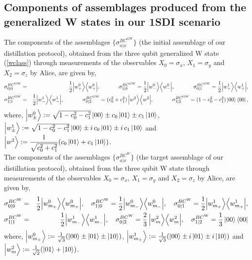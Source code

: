 \documentclass[reprint,superscriptaddress,nofootinbib,amsmath,amssymb,aps,pra,longbibliography]{revtex4-1}
\begin{document}
\begin{widetext}
\section{Components of assemblages produced from the generalized W states in our 1SDI scenario}\label{W_assemb_1SDI}
The components of the assemblages $\{\sigma_{a|x}^{BC^{GW}}\}$ (the initial assemblage of our distillation protocol), obtained from the three qubit generalized W state (\ref{wclass}) through measurements of the observables $X_0= \sigma_x$, $X_1=\sigma_y$ and $X_2=\sigma_z$ by Alice, are given by,  
\begin{eqnarray}
	\sigma_{0|0}^{BC^{\text{GW}}} &=& \frac{1}{2} \Big|w_+^0 \Big\rangle \Big\langle w_+^0 \Big|, \quad  \hspace{0.87cm}		
	\sigma_{1|0}^{BC^{\text{GW}}} = \frac{1}{2} \Big|w_-^0 \Big\rangle \Big\langle w_-^0 \Big|, \quad 	\hspace{0.87cm}
	\sigma_{0|1}^{BC^{\text{GW}}} = \frac{1}{2} \Big|w_+^1 \Big\rangle \Big\langle w_+^1 \Big|, 	 \nonumber \\
	\sigma_{1|1}^{BC^{\text{GW}}} &=& \frac{1}{2} \Big|w_-^1 \Big\rangle \Big\langle w_-^1 \Big|, \quad 	\hspace{0.87cm}
	\sigma_{0|2}^{BC^{\text{GW}}} =   (c_0^2+c_1^2) \, \Big|w^2 \Big\rangle \Big\langle w^2 \Big|,\quad 	\hspace{0.87cm}
	\sigma_{1|2}^{BC^{\text{GW}}} =  (1-c_0^2-c_1^2) \ket{00}\bra{00},
	\label{wassemblage}
\end{eqnarray}
where, $\Big|w_{\pm}^0\Big\rangle := \sqrt{1-c_0^2-c_1^2} \ket{00} \pm c_0 \ket{01} \pm c_1 \ket{10}$, $\Big|w_{\pm}^1\Big\rangle := \sqrt{1-c_0^2-c_1^2} \ket{00} \pm i \, c_0 \ket{01} \pm i \, c_1 \ket{10}$ and $\Big|w^2\Big\rangle :=  \dfrac{1}{\sqrt{c_0^2 + c_1^2}}(c_0 \ket{01} + c_1 \ket{10})$.\\

The components of the assemblages $\{\sigma_{a|x}^{BC^{W}}\}$ (the target assemblage of our distillation protocol), obtained from the three qubit W state through measurements of the observables $X_0= \sigma_x$, $X_1=\sigma_y$ and $X_2=\sigma_z$ by Alice, are given by,  
\begin{eqnarray}
	\sigma_{0|0}^{BC^{\text{W}}} &=& \frac{1}{2} \Big|w_{m_+}^0 \Big\rangle \Big\langle w_{m_+}^0 \Big|, \quad  		
	\sigma_{1|0}^{BC^{\text{W}}} = \frac{1}{2} \Big|w_{m_-}^0 \Big\rangle \Big\langle w_{m_-}^0 \Big|, \quad 
	\sigma_{0|1}^{BC^{\text{W}}} = \frac{1}{2} \Big|w_{m_+}^1 \Big\rangle \Big\langle w_{m_+}^1 \Big|,  \nonumber \\ 		
	\sigma_{1|1}^{BC^{\text{W}}} &=& \frac{1}{2} \Big|w_{m_-}^1 \Big\rangle \Big\langle w_{m_-}^1 \Big|, \quad
	\sigma_{0|2}^{BC^{\text{W}}} = \dfrac{2}{3} \, \Big|w_m^2 \Big\rangle \Big\langle w_m^2 \Big|, \quad
	\sigma_{1|2}^{BC^{\text{W}}} = \frac{1}{3} \ket{00}\bra{00} 
	\label{wpassemblage}
\end{eqnarray}
where, $\Big|w_{m_{\pm}}^0\Big\rangle := \frac{1}{\sqrt{3}}( \ket{00} \pm \ket{01} \pm  \ket{10} )$, $\Big|w_{m_{\pm}}^1\Big\rangle := \frac{1}{\sqrt{3}}( \ket{00} \pm i  \ket{01} \pm i  \ket{10})$ and $\Big|w_m^2\Big\rangle := \frac{1}{\sqrt{2}}( \ket{01} +  \ket{10}) $. 



\end{widetext}
\end{document}
